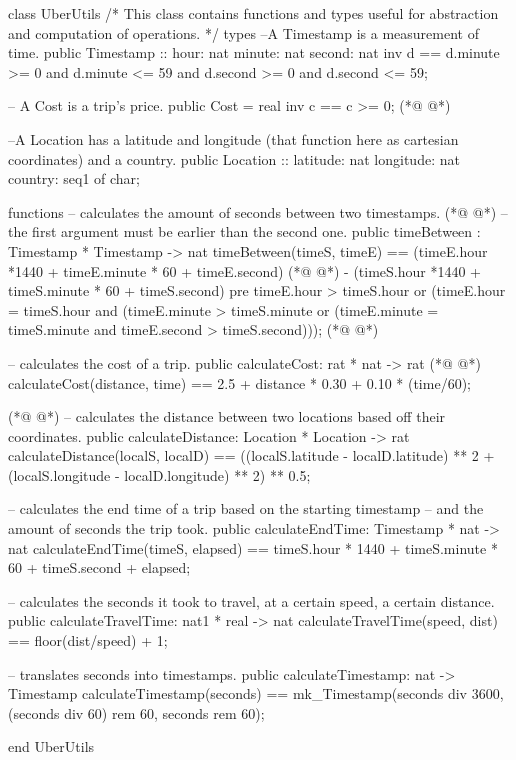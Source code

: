 \begin{vdmpp}[breaklines=true]
class UberUtils
/*
    This class contains functions and types useful for abstraction and computation of operations.
*/
types
    --A Timestamp is a measurement of time.
    public Timestamp :: hour: nat
                        minute: nat
                        second: nat
        inv d == d.minute >= 0 and d.minute <= 59 and d.second >= 0 and d.second <= 59;
    
    -- A Cost is a trip's price.  
    public Cost = real
        inv c == c >= 0;
(*@
\label{timeBetween:15}
@*)
    
    --A Location has a latitude and longitude (that function here as cartesian coordinates) and a country.
    public Location :: latitude: nat
                       longitude: nat
                       country: seq1 of char;

functions
    -- calculates the amount of seconds between two timestamps.
(*@
\label{calculateCost:23}
@*)
    -- the first argument must be earlier than the second one.
    public timeBetween : Timestamp * Timestamp -> nat
        timeBetween(timeS, timeE) == 
            (timeE.hour *1440 + timeE.minute * 60 + timeE.second) 
(*@
\label{calculateDistance:27}
@*)
                    - (timeS.hour *1440 + timeS.minute * 60 + timeS.second)
        pre timeE.hour > timeS.hour or (timeE.hour = timeS.hour and 
                    (timeE.minute > timeS.minute or (timeE.minute = timeS.minute 
                    and timeE.second > timeS.second)));
(*@
\label{calculateEndTime:31}
@*)
    
    -- calculates the cost of a trip.
    public calculateCost: rat * nat -> rat
(*@
\label{calculateTravelTime:34}
@*)
        calculateCost(distance, time) == 
            2.5 + distance * 0.30 + 0.10 * (time/60);
    
(*@
\label{calculateTimestamp:37}
@*)
    -- calculates the distance between two locations based off their coordinates.
    public calculateDistance: Location * Location -> rat    
        calculateDistance(localS, localD) ==
            ((localS.latitude - localD.latitude) ** 2 + (localS.longitude - localD.longitude) ** 2) ** 0.5;
    
    -- calculates the end time of a trip based on the starting timestamp 
    -- and the amount of seconds the trip took.        
    public calculateEndTime: Timestamp * nat -> nat
        calculateEndTime(timeS, elapsed) == 
            timeS.hour * 1440 + timeS.minute * 60 + timeS.second + elapsed;
    
    -- calculates the seconds it took to travel, at a certain speed, a certain distance.
    public calculateTravelTime: nat1 * real -> nat
        calculateTravelTime(speed, dist) == 
            floor(dist/speed) + 1;
    
    -- translates seconds into timestamps.            
    public calculateTimestamp: nat -> Timestamp
        calculateTimestamp(seconds) == 
            mk_Timestamp(seconds div 3600, (seconds div 60) rem 60, seconds rem 60);
        
end UberUtils
\end{vdmpp}

